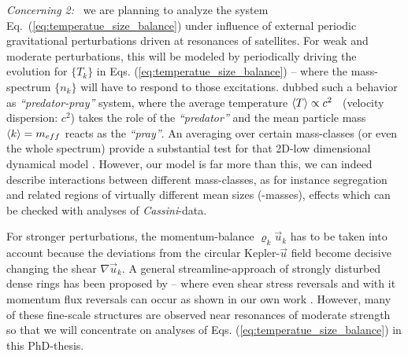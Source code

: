 \documentclass[11pt, notitlepage]{article} %
\begin{document}
{\em Concerning 2:} \, we are planning to analyze the system Eq.~(\ref{eq:temperatue_size_balance}) under influence of external
periodic gravitational perturbations driven at resonances of satellites. For weak and moderate perturbations, this will be modeled by periodically 
driving the evolution for $\{T_k\}$ in Eqs. (\ref{eq:temperatue_size_balance}) -- where the mass-spectrum $\{n_k\}$ will have to respond to 
those excitations.  \citet{esposito2012} dubbed such a behavior as {\em ``predator-pray''} system, where the average temperature 
$\langle T \rangle \propto c^2$  \ (velocity dispersion: $c^2$) takes the role of the {\em ``predator''} and the mean particle mass $\langle k \rangle = m_{eff}$ 
reacts as the {\em ``pray''}. An averaging over certain mass-classes (or even the whole spectrum) provide a substantial test for that 
2D-low dimensional dynamical model \citep{esposito2012}. However, our model is far more than this, we can indeed describe interactions
between different mass-classes, as for instance segregation and related regions of virtually different mean sizes (-masses), effects which 
can be checked with analyses of \emph{Cassini}-data.

For stronger perturbations, the momentum-balance $\varrho_k \vec u_k$ has to be taken into account because the deviations from the
circular Kepler-$\vec u$ field become decisive changing the shear $\nabla\vec u_k$. A general streamline-approach of strongly disturbed 
dense rings has been proposed by \citet{borderies1983d} -- where even shear stress reversals and with it momentum flux reversals can 
occur as shown in our own work \citep{Graetz2019}. However,  many of these fine-scale structures are observed near resonances of moderate 
strength so that we will concentrate on analyses of Eqs. (\ref{eq:temperatue_size_balance}) in this PhD-thesis.


 




\newpage
\end{document}
